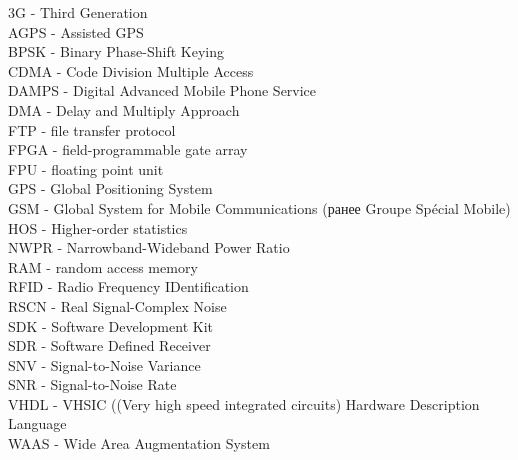 \noindent
3G - Third Generation						\\
AGPS - Assisted GPS						\\
BPSK - Binary Phase-Shift Keying				\\
CDMA - Code Division Multiple Access				\\
DAMPS - Digital Advanced Mobile Phone Service			\\
DMA - Delay and Multiply Approach				\\
FTP - file transfer protocol					\\
FPGA - field-programmable gate array 				\\
FPU - floating point unit					\\
GPS - Global Positioning System					\\
GSM - Global System for Mobile Communications (ранее Groupe Spécial Mobile) \\
HOS - Higher-order statistics					\\
NWPR - Narrowband-Wideband Power Ratio				\\
RAM - random access memory					\\
RFID - Radio Frequency IDentification				\\
RSCN - Real Signal-Complex Noise				\\
SDK - Software Development Kit					\\
SDR - Software Defined Receiver					\\
SNV - Signal-to-Noise Variance					\\
SNR - Signal-to-Noise Rate					\\
VHDL - VHSIC ((Very high speed integrated circuits) Hardware Description Language			\\
WAAS - Wide Area Augmentation System				\\


\newpage
